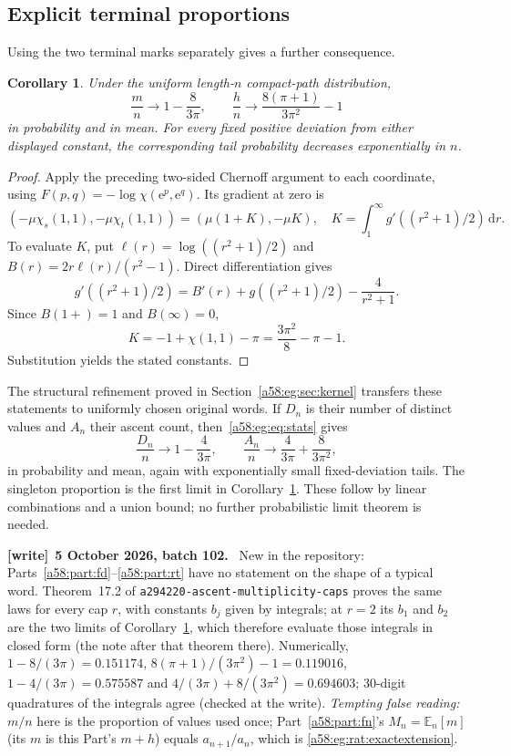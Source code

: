 \documentclass[11pt,letterpaper]{article}
\newcommand{\file}[1]{\nolinkurl{#1}}
\newtheorem{corollary}[theorem]{Corollary}
\theoremstyle{remark}
\newcommand{\E}{\mathbb E}
\newcommand{\egdd}{\,\mathrm d}
\newcommand{\ee}{\mathrm e}
\newcommand{\muval}{\mu}
\newenvironment{writenote}[1][]{\par\smallskip\begingroup\small
 \noindent\textbf{[write]}\if\relax\detokenize{#1}\relax\else~\textbf{#1.}\fi\ }%
 {\par\endgroup\smallskip}
\begin{document}
\subsection{Explicit terminal proportions}
Using the two terminal marks separately gives a further consequence.
\begin{corollary}\label{a58:eg:rat:joint}
Under the uniform length-$n$ compact-path distribution,
\[
 \frac mn\longrightarrow 1-\frac8{3\pi},\qquad
 \frac hn\longrightarrow\frac{8(\pi+1)}{3\pi^2}-1
\]
in probability and in mean. For every fixed positive deviation from either displayed constant, the corresponding tail probability decreases exponentially in $n$.
\end{corollary}
\begin{proof}
Apply the preceding two-sided Chernoff argument to each coordinate, using
$F(p,q)=-\log\chi(\ee^p,\ee^q)$. Its gradient at zero is
\[
 (-\muval\chi_s(1,1),-\muval\chi_t(1,1))
 =(\muval(1+K),-\muval K),\quad
 K=\int_1^\infty g'((r^2+1)/2)\egdd r.
\]
To evaluate $K$, put $\ell(r)=\log((r^2+1)/2)$ and
$B(r)=2r\ell(r)/(r^2-1)$. Direct differentiation gives
\[
 g'((r^2+1)/2)=B'(r)+g((r^2+1)/2)-\frac4{r^2+1}.
\]
Since $B(1+)=1$ and $B(\infty)=0$,
\[
 K=-1+\chi(1,1)-\pi=\frac{3\pi^2}8-\pi-1.
\]
Substitution yields the stated constants.
\end{proof}

The structural refinement proved in Section~\ref{a58:eg:sec:kernel} transfers these statements to uniformly chosen original words. If $D_n$ is their number of distinct values and $A_n$ their ascent count, then~\eqref{a58:eg:eq:stats} gives
\begin{equation}\label{a58:eg:rat:originalstats}
 \frac{D_n}{n}\longrightarrow1-\frac4{3\pi},\qquad
 \frac{A_n}{n}\longrightarrow\frac4{3\pi}+\frac8{3\pi^2},
\end{equation}
in probability and mean, again with exponentially small fixed-deviation tails. The singleton proportion is the first limit in Corollary~\ref{a58:eg:rat:joint}. These follow by linear combinations and a union bound; no further probabilistic limit theorem is needed.

\begin{writenote}[5 October 2026, batch 102]
New in the repository: Parts~\ref{a58:part:fd}--\ref{a58:part:rt} have no statement on the shape of a typical word. Theorem~17.2 of \file{a294220-ascent-multiplicity-caps} proves the same laws for every cap $r$, with constants $b_j$ given by integrals; at $r=2$ its $b_1$ and $b_2$ are the two limits of Corollary~\ref{a58:eg:rat:joint}, which therefore evaluate those integrals in closed form (the note after that theorem there). Numerically, $1-8/(3\pi)=0.151174$, $8(\pi+1)/(3\pi^2)-1=0.119016$, $1-4/(3\pi)=0.575587$ and $4/(3\pi)+8/(3\pi^2)=0.694603$; 30-digit quadratures of the integrals agree (checked at the write). \emph{Tempting false reading:} $m/n$ here is the proportion of values used once; Part~\ref{a58:part:fn}'s $M_n=\E_n[m]$ (its $m$ is this Part's $m+h$) equals $a_{n+1}/a_n$, which is \eqref{a58:eg:rat:exactextension}.
\end{writenote}
\end{document}
